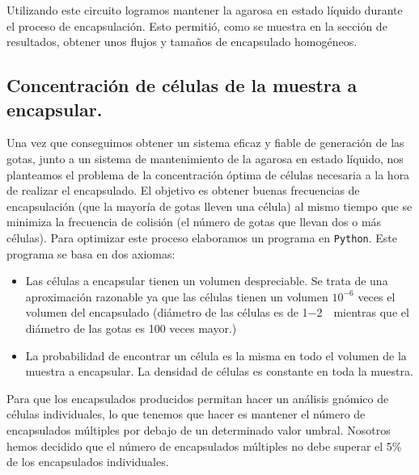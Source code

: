 Utilizando este circuito logramos mantener la agarosa en estado líquido durante el proceso de encapsulación. Esto permitió, como se muestra en la sección de resultados, obtener unos flujos y tamaños de encapsulado homogéneos. 


\subsection{Concentración de células de la muestra a encapsular.}\label{subsec:concentracion_celulas}

Una vez que conseguimos obtener un sistema eficaz y fiable de generación de las gotas, junto a un sistema de mantenimiento de la agarosa en estado líquido, nos planteamos el problema de la concentración óptima de células necesaria a la hora de realizar el encapsulado. El objetivo es obtener buenas frecuencias de encapsulación (que la mayoría de gotas lleven una célula) al mismo tiempo que se minimiza la frecuencia de colisión (el número de gotas que llevan dos o más células). Para optimizar este proceso elaboramos un programa en \texttt{Python}. Este programa se basa en dos axiomas: 

\begin{itemize}
    \item Las células a encapsular tienen un volumen despreciable. Se trata de una aproximación razonable ya que las células tienen un volumen ${10}^{−6}$ veces el volumen del encapsulado (diámetro de las células es de 1−2~\micrometro\ mientras que el diámetro de las gotas es 100 veces mayor.)
    
    \item La probabilidad de encontrar un célula es la misma en todo el volumen de la muestra a encapsular. La densidad de células es constante en toda la muestra.
    
\end{itemize}

Para que los encapsulados producidos permitan hacer un análisis gnómico de células individuales, lo que tenemos que hacer es mantener el número de encapsulados múltiples por debajo de un determinado valor umbral. Nosotros hemos decidido que el número de encapsulados múltiples no debe superar el 5\% de los encapsulados individuales. 

